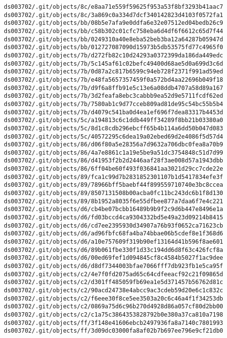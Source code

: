\documentclass[11pt]{article}
\begin{document}
\begin{Verbatim}[commandchars=\\\{\}]
ds003702/.git/objects/8c/e8aa71e559f59625f953a53f8bf3293b41aac7
ds003702/.git/objects/8c/3a869c0a334d7dcf340142823d4103f0572fa1
ds003702/.git/objects/bb/08b5e7afa9e0ddfa6e32e07512ed04bedb26c9
ds003702/.git/objects/bb/c58b302c01cfc758eba6d4df6f6612c65d7f44
ds003702/.git/objects/bb/0249310a40e8eba52beb3ba12a64287b05947d
ds003702/.git/objects/bb/012727087090d15973b5db53575fd77c4965f0
ds003702/.git/objects/7b/d272fb82c10d24293a0372399da186da449edc
ds003702/.git/objects/7b/5c145af61c02befc49400d68ae5d0a699d3c6d
ds003702/.git/objects/7b/0d87a2c817b6599c94eb728f2371f991ad59ed
ds003702/.git/objects/7b/e48fa5657357459f0a572bd4aa22696b049f18
ds003702/.git/objects/7b/d9f6a8ffb91e5c13e6a08ddb4707a58d89a167
ds003702/.git/objects/7b/3d2feafa8ebc3cabbb9ea52d9e5711fcdf62ed
ds003702/.git/objects/7b/7580ab1c9d77cceb809ad81de95c54bc55b5b4
ds003702/.git/objects/7b/d4079c541ba0d4ea1ef696f7dea83317b4453d
ds003702/.git/objects/5c/a194813c6c1ddb449ff34289f8bb21b03380a0
ds003702/.git/objects/5c/8d1c8cdb296ebcff65b4b114a6dd50b047d083
ds003702/.git/objects/5c/40572295c6dea19a02ebed69d2e4086f5d57d4
ds003702/.git/objects/86/d06f80a5e28356a7d9632a706dbc0fea8a70b9
ds003702/.git/objects/86/4a7e8861c1a19e5be9a51dc3754848c51d7d99
ds003702/.git/objects/86/d41953f2b2d2446aaf28f3ae008d57a1943dbb
ds003702/.git/objects/86/6ff04be60f493f036841aa3021d29cc7cde22e
ds003702/.git/objects/89/fca1c99d7b2831852301107b1d5417834efe3f
ds003702/.git/objects/89/78966bff5baebf44f899559710740e3bc8ccea
ds003702/.git/objects/89/8507131508b00acba0fc11bc243dc6b1f8d130
ds003702/.git/objects/89/8b1952a8035f6e55dfbee877a7daa6f7e4c221
ds003702/.git/objects/d6/cb4be07bcbb16489b9b9f2c9d6b447e8496e1a
ds003702/.git/objects/d6/fd03bccd4ca9304332bd5e49a23d09214b8415
ds003702/.git/objects/d6/cd7ee2395930d34907a76b93f0652ca71623cb
ds003702/.git/objects/d6/ad96fbfc68fa4ba74bbae06b5cdef8e1f368d6
ds003702/.git/objects/d6/a10e757609f319b90ef13164d41b596f8ae601
ds003702/.git/objects/d6/89b061fbe330f1d33c194dd6d8f63c426fcf8a
ds003702/.git/objects/d6/00ed69fef1d094845cf8c4584b5027f1ac9dee
ds003702/.git/objects/d6/d8df7344003bfae7066fff7db923fb1e5ca95f
ds003702/.git/objects/c2/4e7f0fd2075ad65c64cdfeeacf92c21f09865d
ds003702/.git/objects/c2/d301ff485059fb69ea1e5d371457b56762d81c
ds003702/.git/objects/c2/90acd24738e4abcc9ac3cdeb59d20e6c1c832c
ds003702/.git/objects/c2/f6eee30f8ce5ee3503a20c6c46a4f1f34253db
ds003702/.git/objects/c2/0869a75d6c96b270d4928d86a057cf80d2bb00
ds003702/.git/objects/c2/c1a75c3864353828792b0e380a37ca810a7198
ds003702/.git/objects/ff/3f148e41606ebcb2497936fa8a7140c7801993
ds003702/.git/objects/ff/3d09dc03000fa8af02b7b697ee796e9cf21db0

\end{Verbatim}
\end{document}
